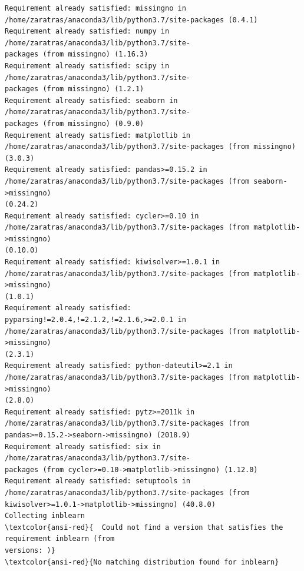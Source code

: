 \documentclass[8pt,onecolumn,aps,pra]{revtex4-1}
\begin{document}
    \begin{Verbatim}[commandchars=\\\{\}]
Requirement already satisfied: missingno in
/home/zaratras/anaconda3/lib/python3.7/site-packages (0.4.1)
Requirement already satisfied: numpy in /home/zaratras/anaconda3/lib/python3.7/site-
packages (from missingno) (1.16.3)
Requirement already satisfied: scipy in /home/zaratras/anaconda3/lib/python3.7/site-
packages (from missingno) (1.2.1)
Requirement already satisfied: seaborn in /home/zaratras/anaconda3/lib/python3.7/site-
packages (from missingno) (0.9.0)
Requirement already satisfied: matplotlib in
/home/zaratras/anaconda3/lib/python3.7/site-packages (from missingno) (3.0.3)
Requirement already satisfied: pandas>=0.15.2 in
/home/zaratras/anaconda3/lib/python3.7/site-packages (from seaborn->missingno)
(0.24.2)
Requirement already satisfied: cycler>=0.10 in
/home/zaratras/anaconda3/lib/python3.7/site-packages (from matplotlib->missingno)
(0.10.0)
Requirement already satisfied: kiwisolver>=1.0.1 in
/home/zaratras/anaconda3/lib/python3.7/site-packages (from matplotlib->missingno)
(1.0.1)
Requirement already satisfied: pyparsing!=2.0.4,!=2.1.2,!=2.1.6,>=2.0.1 in
/home/zaratras/anaconda3/lib/python3.7/site-packages (from matplotlib->missingno)
(2.3.1)
Requirement already satisfied: python-dateutil>=2.1 in
/home/zaratras/anaconda3/lib/python3.7/site-packages (from matplotlib->missingno)
(2.8.0)
Requirement already satisfied: pytz>=2011k in
/home/zaratras/anaconda3/lib/python3.7/site-packages (from
pandas>=0.15.2->seaborn->missingno) (2018.9)
Requirement already satisfied: six in /home/zaratras/anaconda3/lib/python3.7/site-
packages (from cycler>=0.10->matplotlib->missingno) (1.12.0)
Requirement already satisfied: setuptools in
/home/zaratras/anaconda3/lib/python3.7/site-packages (from
kiwisolver>=1.0.1->matplotlib->missingno) (40.8.0)
Collecting inblearn
\textcolor{ansi-red}{  Could not find a version that satisfies the requirement inblearn (from
versions: )}
\textcolor{ansi-red}{No matching distribution found for inblearn}

    \end{Verbatim}
\end{document}
